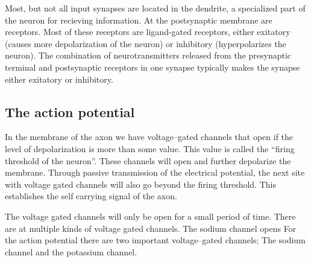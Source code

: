 Most, but not all input synapses are located in the dendrite, a specialized part of the neuron for recieving information. 
At the postsynaptic membrane are receptors. Most of these receptors are ligand-gated receptors, either exitatory (causes more depolarization of the neuron) or inhibitory (hyperpolarizes the neuron). 
The combination of neurotransmitters released from the presynaptic terminal and postsynaptic receptors in one synapse typically makes the synapse either exitatory or inhibitory.


\subsection{The action potential}
\label{sssecTheActionPotential}
In the membrane of the axon we have voltage--gated channels that open if the level of depolarization is more than some value. This value is called the ``firing threshold of the neuron''.
These channels will open and further depolarize the membrane. Through passive transmission of the electrical potential, the next site with voltage gated channels will also go beyond the firing threshold.
This establishes the self carrying signal of the axon.
%

The voltage gated channels will only be open for a small period of time.
There are at multiple kinds of voltage gated channels. The sodium channel opens
For the action potential there are two important voltage--gated channels; The sodium channel and the potassium channel.

